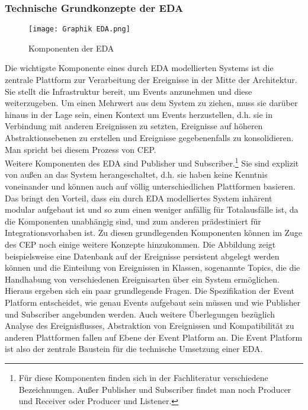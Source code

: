 \subsubsection*{Technische Grundkonzepte der \ac{EDA}}
\begin{figure}[H]
  \centering
	\texttt{[image: Graphik EDA.png]}
   \caption[Komponenten der Event-Driven Architecture]{Komponenten der \ac{EDA}\footnotemark}
\end{figure}
Die wichtigste Komponente eines durch \ac{EDA} modellierten Systems ist die zentrale Plattform zur Verarbeitung der Ereignisse in der Mitte der Architektur. Sie stellt die Infrastruktur bereit, um Events anzunehmen und diese weiterzugeben. Um einen Mehrwert aus dem System zu ziehen, muss sie darüber hinaus in der Lage sein, einen Kontext um Events herzustellen, d.h. sie in Verbindung mit anderen Ereignissen zu setzten, Ereignisse auf höheren Abstraktionsebenen zu erstellen und Ereignisse gegebenenfalls zu konsolidieren. Man spricht bei diesem Prozess von 
\ac{CEP}.\\
Weitere Komponenten des \ac{EDA} sind Publisher und Subscriber.\footnote{Für diese Komponenten finden sich in der Fachliteratur verschiedene Bezeichnungen. Außer Publisher und Subscriber findet man noch Producer und Receiver oder Producer und Listener.} Sie sind explizit von außen an das System herangeschaltet, d.h. sie haben keine Kenntnis voneinander und können auch auf völlig unterschiedlichen Plattformen basieren. Das bringt den Vorteil, dass ein durch \ac{EDA} modelliertes System inhärent modular aufgebaut ist und so zum einen weniger anfällig für Totalausfälle ist, da die Komponenten unabhängig sind, und zum anderen prädestiniert für Integrationsvorhaben ist.
Zu diesen grundlegenden Komponenten können im Zuge des \ac{CEP} noch einige weitere Konzepte hinzukommen. Die Abbildung zeigt beispielsweise eine Datenbank auf der Ereignisse persistent abgelegt werden können und die Einteilung von Ereignissen in Klassen, sogenannte Topics, die die Handhabung von verschiedenen Ereignisarten über ein System ermöglichen.\\
Hieraus ergeben sich ein paar grundlegende Fragen. Die Spezifikation der Event Platform entscheidet, wie genau Events aufgebaut sein müssen und wie Publisher und Subscriber angebunden werden. Auch weitere Überlegungen bezüglich Analyse des Ereignisflusses, Abstraktion von Ereignissen und Kompatibilität zu anderen Plattformen fallen auf Ebene der Event Platform an. Die Event Platform ist also der zentrale Baustein für die technische Umsetzung einer \ac{EDA}. \cite[Vgl. ][S. 244]{CLOUD2021}
